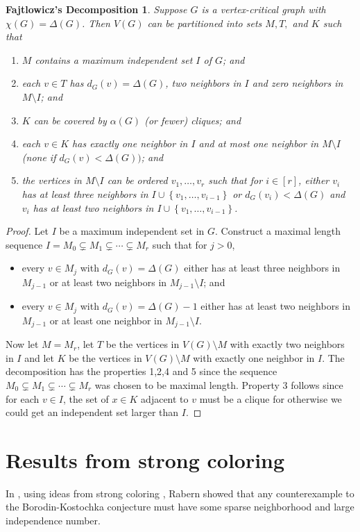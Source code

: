 \documentclass[12pt]{article}
\theoremstyle{plain}
\newtheorem*{FajtlowiczDecomp}{Fajtlowicz's Decomposition}
\theoremstyle{definition}
\theoremstyle{remark}
\newcommand{\set}[1]{\left\{ #1 \right\}}
\newcommand{\irange}[1]{\left[#1\right]}
\begin{document}
\begin{FajtlowiczDecomp}
Suppose $G$ is a vertex-critical graph with $\chi(G) = \Delta(G)$.  Then $V(G)$ can be partitioned into sets $M, T,$ and $K$ such that
\begin{enumerate}
\item $M$ contains a maximum independent set $I$ of $G$; and
\item each $v \in T$ has $d_G(v) = \Delta(G)$, two neighbors in $I$ and zero neighbors in $M\setminus I$; and
\item $K$ can be covered by $\alpha(G)$ (or fewer) cliques; and
\item each $v \in K$ has exactly one neighbor in $I$ and at most one neighbor in $M\setminus I$ (none if $d_G(v) < \Delta(G))$; and
\item the vertices in $M \setminus I$ can be ordered $v_1, \ldots, v_r$ such that for $i \in \irange{r}$, either $v_i$ has at least three neighbors in $I \cup \set{v_1, \ldots, v_{i-1}}$
or $d_G(v_i) < \Delta(G)$ and $v_i$ has at least two neighbors in $I \cup \set{v_1, \ldots, v_{i-1}}$.
\end{enumerate}
\end{FajtlowiczDecomp}
\begin{proof}
Let $I$ be a maximum independent set in $G$.  Construct a maximal length sequence $I = M_0 \subsetneq M_1 \subsetneq \cdots \subsetneq M_r$ such that for $j>0$, 
\begin{itemize}
\item every $v \in M_j$ with $d_G(v) = \Delta(G)$ either has at least three neighbors in $M_{j-1}$ or at least two neighbors in $M_{j-1} \setminus I$; and
\item every $v \in M_j$ with $d_G(v) = \Delta(G) - 1$ either has at least two neighbors in $M_{j-1}$ or at least one neighbor in $M_{j-1} \setminus I$.
\end{itemize}
Now let $M = M_r$, let $T$ be the vertices in $V(G) \setminus M$ with exactly two neighbors in $I$ and let $K$ be the vertices in $V(G) \setminus M$ with exactly one neighbor in $I$.
The decomposition has the properties 1,2,4 and 5 since the sequence $M_0 \subsetneq M_1 \subsetneq \cdots \subsetneq M_r$ was chosen to be maximal length.  Property 3 follows since
for each $v \in I$, the set of $x \in K$ adjacent to $v$ must be a clique for otherwise we could get an independent set larger than $I$.
\end{proof}

\section{Results from strong coloring}\label{sparseneighborhoods}
In \cite{denseneighborhoods}, using ideas from strong coloring \cite{haxell2004strong, aharoni2007independent}, Rabern showed that any counterexample to the 
Borodin-Kostochka conjecture must have some sparse neighborhood and large independence number.
\end{document}
